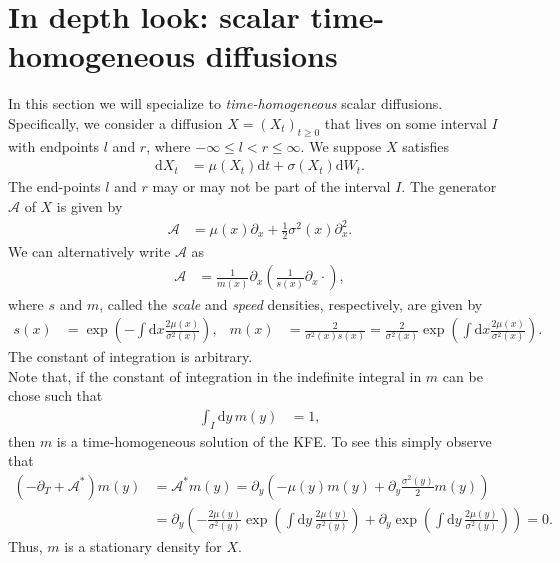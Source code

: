\documentclass[12pt]{book}
\numberwithin{equation}{chapter}
\theoremstyle{plain}
\numberwithin{theorem}{section}
\theoremstyle{definition}
\numberwithin{exercise}{chapter}
\newcommand{\<}{\langle}
\renewcommand{\>}{\rangle}
\renewcommand{\(}{\left(}
\renewcommand{\)}{\right)}
\renewcommand{\[}{\left[}
\renewcommand{\]}{\right]}
\newcommand\Ac{\mathscr{A}}
\newcommand\sig{\sigma}
\renewcommand\d{\partial}
\newcommand\dd{\mathrm{d}}
\begin{document}
\section{In depth look: scalar time-homogeneous diffusions}
In this section we will specialize to \emph{time-homogeneous} scalar diffusions.  Specifically, we consider a diffusion $X = (X_t)_{t \geq 0}$ that lives on some interval $I$ with endpoints $l$ and $r$, where $-\infty \leq l < r \leq \infty$.  We suppose $X$ satisfies
\begin{align}
\dd X_t
	&=	\mu(X_t) \dd t + \sig(X_t) \dd W_t .
\end{align}
The end-points $l$ and $r$ may or may not be part of the interval $I$.  The generator $\Ac$ of $X$ is given by
\begin{align}
\Ac
	&=	\mu(x) \d_x + \tfrac{1}{2} \sig^2(x) \d_x^2 .
\end{align}
We can alternatively write $\Ac$ as
\begin{align}
\Ac
	&=	\frac{1}{m(x)} \d_x \( \frac{1}{s(x)} \d_x \cdot \) , \label{eq:self.adjoint}
\end{align}
where $s$ and $m$, called the \emph{scale} and \emph{speed} densities, respectively, are given by
\begin{align}
s(x)
	&=	\exp \( - \int \dd x \frac{2 \mu(x) }{\sig^2(x)} \) , &
m(x)
	&=	\frac{2}{\sig^2(x) s(x)} 
	=		\frac{2}{\sig^2(x)} \exp \( \int \dd x \frac{2 \mu(x) }{\sig^2(x)} \) . \label{eq:s.and.m}
\end{align}
The constant of integration is arbitrary.  
\\[0.5em]
Note that, if the constant of integration in the indefinite integral in $m$ can be chose such that
\begin{align}
\int_I \dd y \, m(y)
	&=	1 ,
\end{align}
then $m$ is a time-homogeneous solution of the KFE.  To see this simply observe that
\begin{align}
(-\d_T + \Ac^* )m(y)
	&=	\Ac^* m(y)
	=	\d_y \( - \mu(y) m(y) + \d_y \frac{\sig^2(y)}{2} m(y) \) \\
	&=	\d_y \( - \frac{2 \mu(y)}{\sig^2(y)} \exp\( \int \dd y \, \frac{2 \mu(y)}{\sig^2(y)} \) + \d_y \exp\( \int \dd y \, \frac{2 \mu(y)}{\sig^2(y)}\) \)
	=		0 .
\end{align}
Thus, $m$ is a stationary density for $X$.
\end{document}
